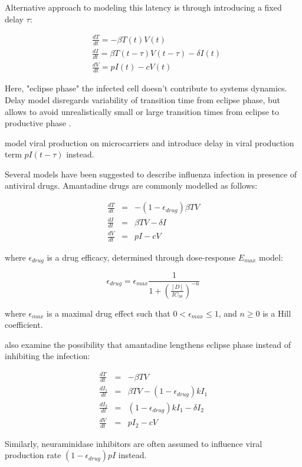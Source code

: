 Alternative approach to modeling this latency is through introducing a fixed delay $\tau$:

\begin{equation}
\begin{array}{rcl}
&\frac{dT}{dt} = - \beta T(t) V(t) \\
&\frac{dI}{dt} = \beta T(t-\tau) V(t-\tau) - \delta I(t) \\
&\frac{dV}{dt} = p I(t) - c V(t)
\end{array}
\end{equation}

Here, "eclipse phase" the infected cell doesn't contribute to systems dynamics. Delay model disregards variability of transition time from eclipse phase, but allows to avoid unrealistically small or large transition times from eclipse to productive phase \cite{beauchemin2008modeling}.

\cite{mohler2005mathematical,schulze2009infection} model viral production on microcarriers and introduce delay in viral production term $p I(t - \tau)$ instead.

Several models have been suggested to describe influenza infection in presence of antiviral drugs. Amantadine drugs are commonly modelled as follows:

\begin{equation}
\begin{array}{rcl}
\frac{dT}{dt} &=& - (1-\epsilon_{drug})\beta T V \\
\frac{dI}{dt} &=& \beta T V - \delta I \\
\frac{dV}{dt} &=& p I - c V
\end{array}
\end{equation}

where $\epsilon_{drug}$ is a drug efficacy, determined through dose-response $E_{max}$ model:

\begin{equation}
\epsilon_{drug} = \epsilon_{max}\frac{1}{1 + (\frac{[D]}{IC_{50}})^{-n}}
\end{equation}

where $\epsilon_{max}$ is a maximal drug effect such that $0 < \epsilon_{max} \le 1$, and $n \ge 0$ is a Hill coefficient.

\cite{beauchemin2008modeling} also examine the possibility that amantadine lengthens eclipse phase instead of inhibiting the infection:

\begin{equation}
\begin{array}{rcl}
\frac{dT}{dt} &=& - \beta T V \\
\frac{dI_1}{dt} &=& \beta T V - (1-\epsilon_{drug}) k I_1 \\
\frac{dI_2}{dt} &=& (1-\epsilon_{drug}) k I_1 - \delta I_2 \\
\frac{dV}{dt} &=& p I_2 - c V
\end{array}
\end{equation}

Similarly, neuraminidase inhibitors are often assumed to influence viral production rate $(1-\epsilon_{drug}) p I$ instead.

